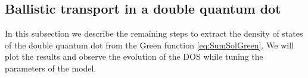 


\subsection{Ballistic transport in a  double quantum dot \label{sec:GreedDQD}}


In this subsection we describe the remaining steps to extract the density of states of the double quantum dot from the Green function \ref{eq:SumSolGreen}. We will plot the results and observe the evolution of the DOS while tuning the parameters of the model. 

